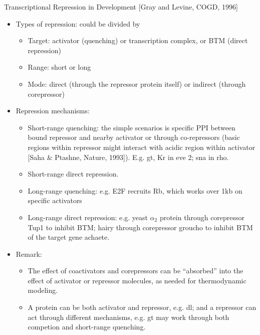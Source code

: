 \documentclass{report}
\begin{document}
Transcriptional Repression in Development [Gray and Levine, COGD, 1996]
\begin{itemize}
	\item Types of repression: could be divided by
	\begin{itemize}
		\item Target: activator (quenching) or transcription complex, or BTM (direct repression)
		\item Range: short or long
		\item Mode: direct (through the repressor protein itself) or indirect (through corepressor)
	\end{itemize}
	
	\item Repression mechanisms: 
	\begin{itemize}
		\item Short-range quenching: the simple scenarios is specific PPI between bound repressor and nearby activator or through co-repressors (basic regions within repressor might interact with acidic region within activator [Saha \& Ptashne, Nature, 1993]). E.g. gt, Kr in eve 2; sna in rho. 
		\item Short-range direct repression. 
		\item Long-range quenching: e.g. E2F recruits Rb, which works over 1kb on specific activators
		\item Long-range direct repression: e.g. yeast $\alpha_2$ protein through corepressor Tup1 to inhibit BTM; hairy through corepressor groucho to inhibit BTM of the target gene achaete. 
	\end{itemize}
	
	\item Remark:
	\begin{itemize}
		\item The effect of coactivators and corepressors can be ``absorbed'' into the effect of activator or repressor molecules, as needed for thermodynamic modeling. 
		\item A protein can be both activator and repressor, e.g. dl; and a repressor can act through different mechanisms, e.g. gt may work through both competion and short-range quenching. 
	\end{itemize}
\end{itemize}
\end{document}
